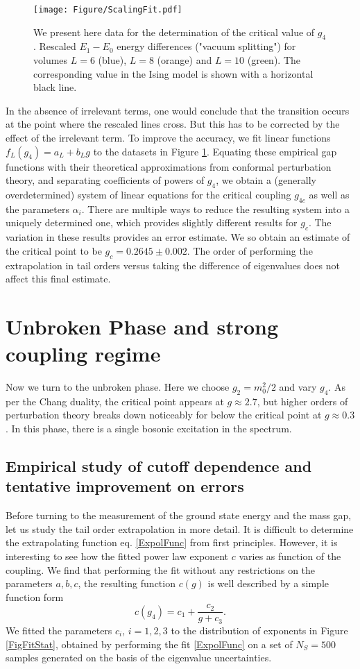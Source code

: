 \documentclass[twocolumn,secnumarabic,amssymb, nobibnotes, aps, prd]{revtex4-2}
\newcommand{\be}{\begin{equation}}
\newcommand{\ee}{\end{equation}}
\begin{document}
\begin{figure}
\centering
\texttt{[image: Figure/ScalingFit.pdf]}
\caption{We present here data for the determination of the critical value of $g_4$. Rescaled $E_1-E_0$ energy differences ("vacuum splitting") for volumes $L=6$ (blue), $L=8$ (orange) and $L=10$ (green). The corresponding value in the Ising model is shown with a horizontal black line.}
\label{FigCritPoint}
\end{figure}

In the absence of irrelevant terms, one would conclude that the transition occurs at the point where the rescaled lines cross. But this has to be corrected by the effect of the irrelevant term.
To improve the accuracy, we fit linear functions $f_L(g_4)=a_L + b_L g$
to the datasets in Figure \ref{FigCritPoint}. Equating these empirical gap functions with their theoretical approximations from conformal perturbation theory, and separating coefficients of powers of $g_4$, we obtain a (generally overdetermined) system of linear equations for the critical coupling $g_{4c}$ as well as the parameters $\alpha_i$. There are multiple ways to reduce the resulting system into a uniquely determined one, which provides slightly different results for $g_c$. The variation in these results provides an error estimate.
We so obtain an estimate of the critical point to be $g_c=0.2645\pm0.002$.
 The order of performing the extrapolation in tail orders versus taking the difference of eigenvalues does not affect this final estimate.
 
\section{Unbroken Phase and strong coupling regime}
Now we turn to the unbroken phase. Here we choose $g_2=m_0^2/2$ and vary $g_4$. As per the Chang duality, the critical point appears at $g\approx2.7$, but higher orders of perturbation theory breaks down noticeably for below the critical point at $g\approx0.3$. In this phase, there is a single bosonic excitation in the spectrum. 



\subsection{Empirical study of cutoff dependence and tentative improvement on errors } \label{ExtrapSec2}
Before turning to the measurement of the ground state energy and the mass gap, let us study the tail order extrapolation in more detail. It is difficult to determine the extrapolating function eq. \eqref{ExpolFunc} from first principles. However, it is interesting to see how the fitted power law exponent $c$ varies as function of the coupling. We find that performing the fit without any restrictions on the parameters $a,b,c$, the resulting function $c(g)$ is well described by a simple function form
\be
c(g_4)=c_1+ \frac{c_2}{g+c_3}. \label{FitCForm}
\ee
We fitted the parameters $c_i$, $i=1,2,3$ to the distribution of exponents in Figure \ref{FigFitStat}, obtained by performing the fit \eqref{ExpolFunc} on a set of $N_S=500$ samples generated on the basis of the eigenvalue uncertainties.
\end{document}
